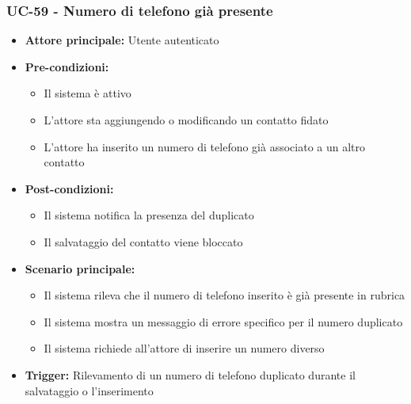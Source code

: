 \documentclass[a4paper,12pt]{article}
\begin{document}
\subsubsection{UC-59 - Numero di telefono già presente} \label{subsec:UC-59}
\begin{itemize}
    \item \textbf{Attore principale:} Utente autenticato
    \item \textbf{Pre-condizioni:}
    \begin{itemize}
        \item Il sistema è attivo
        \item L'attore sta aggiungendo o modificando un contatto fidato
        \item L'attore ha inserito un numero di telefono già associato a un altro contatto
    \end{itemize}
    \item \textbf{Post-condizioni:}
    \begin{itemize}
        \item Il sistema notifica la presenza del duplicato
        \item Il salvataggio del contatto viene bloccato
    \end{itemize}
    \item \textbf{Scenario principale:}
    \begin{itemize}
        \item Il sistema rileva che il numero di telefono inserito è già presente in rubrica
        \item Il sistema mostra un messaggio di errore specifico per il numero duplicato
        \item Il sistema richiede all'attore di inserire un numero diverso
    \end{itemize}
    \item \textbf{Trigger:} Rilevamento di un numero di telefono duplicato durante il salvataggio o l'inserimento
\end{itemize}
\end{document}
